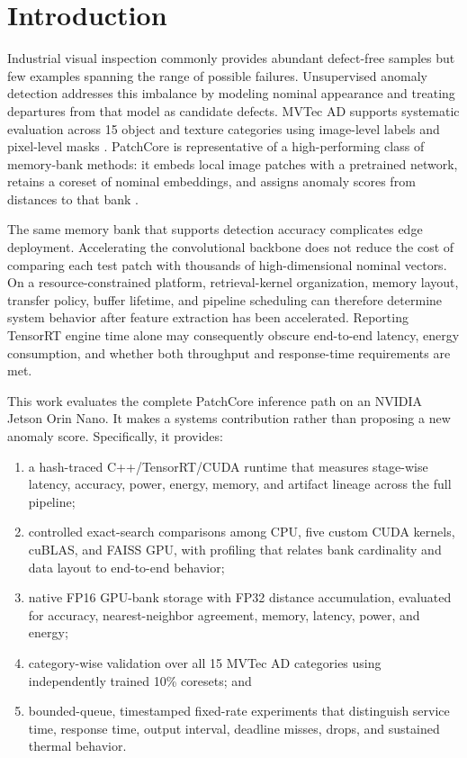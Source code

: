 \documentclass[twocolumn]{svjour3}
\begin{document}
\section{Introduction}\label{sec:introduction}
Industrial visual inspection commonly provides abundant defect-free samples
but few examples spanning the range of possible failures. Unsupervised anomaly
detection addresses this imbalance by modeling nominal appearance and treating
departures from that model as candidate defects. MVTec AD supports systematic
evaluation across 15 object and texture categories using image-level labels and
pixel-level masks \cite{bergmann2019mvtec}. PatchCore is representative of a
high-performing class of memory-bank methods: it embeds local image patches
with a pretrained network, retains a coreset of nominal embeddings, and assigns
anomaly scores from distances to that bank \cite{roth2022patchcore}.

The same memory bank that supports detection accuracy complicates edge
deployment. Accelerating the convolutional backbone does not reduce the cost
of comparing each test patch with thousands of high-dimensional nominal
vectors. On a resource-constrained platform, retrieval-kernel organization,
memory layout, transfer policy, buffer lifetime, and pipeline scheduling can
therefore determine system behavior after feature extraction has been
accelerated. Reporting TensorRT engine time alone may consequently obscure
end-to-end latency, energy consumption, and whether both throughput and
response-time requirements are met.

This work evaluates the complete PatchCore inference path on an NVIDIA Jetson
Orin Nano. It makes a systems contribution rather than proposing a new anomaly
score. Specifically, it provides:
\begin{enumerate}
\item a hash-traced C++/TensorRT/CUDA runtime that measures stage-wise latency,
accuracy, power, energy, memory, and artifact lineage across the full pipeline;
\item controlled exact-search comparisons among CPU, five custom CUDA kernels,
cuBLAS, and FAISS GPU, with profiling that relates bank cardinality and data
layout to end-to-end behavior;
\item native FP16 GPU-bank storage with FP32 distance accumulation, evaluated
for accuracy, nearest-neighbor agreement, memory, latency, power, and energy;
\item category-wise validation over all 15 MVTec AD categories using
independently trained 10\% coresets; and
\item bounded-queue, timestamped fixed-rate experiments that distinguish service
time, response time, output interval, deadline misses, drops, and sustained
thermal behavior.
\end{enumerate}
\end{document}
